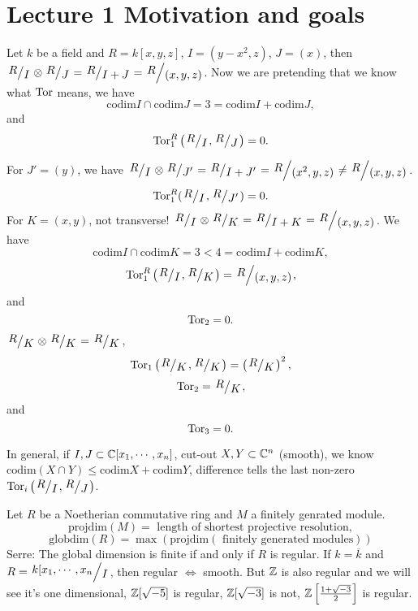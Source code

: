 \section{Lecture 1 Motivation and goals}
\begin{example}
  Let $k$ be a field and $R=k[x,y,z]$, $I=(y-x^2,z)$, $J=(x)$, then $\sfrac{R}{I}\otimes \sfrac{R}{J}=\sfrac{R}{I+J}=\sfrac{R}{(x,y,z)}$. Now we are pretending that we know what $\operatorname{Tor} $ means, we have 
  \[
  \mathrm{codim}I\cap \mathrm{codim}J=3=\mathrm{codim}I+\mathrm{codim}J,
  \] 
  and
  \[
    \Tor_1^{R}\left( \sfrac{R}{I},\sfrac{R}{J} \right) =0.
  \]
 
  For $J'=(y)$, we have $\sfrac{R}{I}\otimes \sfrac{R}{J'}=\sfrac{R}{I+J'}=\sfrac{R}{(x^2,y,z)}\neq \sfrac{R}{(x,y,z)}$.
\[
  \Tor_1^{R}(\sfrac{R}{I},\sfrac{R}{J'})=0.
\] 
  For $K=(x,y)$, not transverse! $\sfrac{R}{I}\otimes \sfrac{R}{K}=\sfrac{R}{I+K}=\sfrac{R}{(x,y,z)}$. We have
  \[
  \mathrm{codim}I\cap \mathrm{codim}K=3<4=\mathrm{codim}I+\mathrm{codim}K,
  \] 
  \[
    \Tor_1^{R}\left( \sfrac{R}{I},\sfrac{R}{K} \right) =\sfrac{R}{(x,y,z)},
  \] 
  and 
  \[
  \operatorname{Tor}_2=0.
  \] 
  $\sfrac{R}{K}\otimes \sfrac{R}{K}=\sfrac{R}{K}$, 
  \[
    \Tor_1\left( \sfrac{R}{K},\sfrac{R}{K} \right) =\left( \sfrac{R}{K} \right) ^2,
  \] 
  \[
  \Tor_2=\sfrac{R}{K},
  \] 
  and
  \[
  \operatorname{Tor}_3=0.
  \] 
\end{example}
In general, if $I,J\subset \mathbb{C}[x_1,\cdots ,x_n]$, cut-out $X,Y\subset \mathbb{C}^{n}$ (smooth), we know $\mathrm{codim}(X\cap Y)\le \mathrm{codim}X+\mathrm{codim}Y$, difference tells the last non-zero $\Tor_i\left( \sfrac{R}{I},\sfrac{R}{J} \right) $.

\begin{example}
  Let $R$ be a Noetherian commutative ring and $M$ a finitely genrated module. 
  \[
    \mathrm{projdim}(M)=\text{ length of shortest projective resolution},
  \] 
  \[
    \mathrm{globdim}(R)=\max\left(\mathrm{projdim}\left( \text{ finitely generated modules} \right)   \right) 
  \] 
  Serre: The global dimension is finite if and only if $R$ is regular. If $k=\overline{k}$ and $R=\sfrac{k[x_1,\cdots ,x_n}{I}$, then regular $\Leftrightarrow$ smooth. But $\mathbb{Z}$ is also regular and we will see it's one dimensional, $\mathbb{Z}[\sqrt{-5} ]$ is regular, $\mathbb{Z}[\sqrt{-3} ]$ is not, $\mathbb{Z}\left[ \frac{1+\sqrt{-3} }{2} \right] $ is regular.
\end{example}
